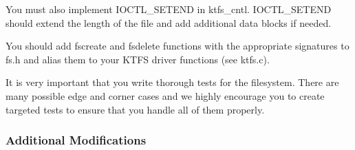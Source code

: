 \documentclass{article}
\begin{document}
        You must also implement {\fix IOCTL\_SETEND} in {\fix ktfs\_cntl}. {\fix IOCTL\_SETEND} should extend the length of the file
        and add additional data blocks if needed.

        You should add {\fix fscreate} and {\fix fsdelete} functions with the appropriate signatures to {\fix fs.h} and alias them to your KTFS driver functions
        (see {\fix ktfs.c}).

        It is very important that you write thorough tests for the filesystem. There are many possible edge and corner cases and we highly encourage you to create
        targeted tests to ensure that you handle all of them properly.

		\subsubsection{Additional Modifications}
\end{document}
